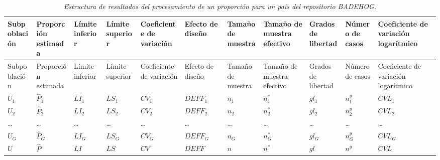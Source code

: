 \documentclass[
  12pt,
  spanish,
]{book}
\begin{document}
\begin{longtable}[]{@{}
  >{\centering\arraybackslash}p{}
  >{\centering\arraybackslash}p{}
  >{\centering\arraybackslash}p{}
  >{\centering\arraybackslash}p{}
  >{\centering\arraybackslash}p{}
  >{\centering\arraybackslash}p{}
  >{\centering\arraybackslash}p{}
  >{\centering\arraybackslash}p{}
  >{\centering\arraybackslash}p{}
  >{\centering\arraybackslash}p{}
  >{\centering\arraybackslash}p{}@{}}
\caption{\emph{Estructura de resultados del procesamiento de un proporción para un país del repositorio BADEHOG.}
\label{T2}}\tabularnewline
\toprule
Subpoblación & Proporción estimada & Límite inferior & Límite superior & Coeficiente de variación & Efecto de diseño & Tamaño de muestra & Tamaño de muestra efectivo & Grados de libertad & Número de casos & Coeficiente de variación logarítmico \\
\midrule
\endfirsthead
\toprule
Subpoblación & Proporción estimada & Límite inferior & Límite superior & Coeficiente de variación & Efecto de diseño & Tamaño de muestra & Tamaño de muestra efectivo & Grados de libertad & Número de casos & Coeficiente de variación logarítmico \\
\midrule
\endhead
\(U_1\) & \(\hat{P}_1\) & \(LI_1\) & \(LS_1\) & \(CV_1\) & \(DEFF_1\) & \(n_1\) & \(n^*_1\) & \(gl_1\) & \(n^y_1\) & \(CVL_1\) \\
\(U_2\) & \(\hat{P}_2\) & \(LI_2\) & \(LS_2\) & \(CV_2\) & \(DEFF_2\) & \(n_2\) & \(n^*_2\) & \(gl_2\) & \(n^y_2\) & \(CVL_2\) \\
\ldots{} & \ldots{} & \ldots{} & \ldots{} & \ldots{} & \ldots{} & \ldots{} & \ldots{} & \ldots{} & \ldots{} & \ldots{} \\
\(U_G\) & \(\hat{P}_G\) & \(LI_G\) & \(LS_G\) & \(CV_G\) & \(DEFF_G\) & \(n_G\) & \(n^*_G\) & \(gl_G\) & \(n^y_G\) & \(CVL_G\) \\
\(U\) & \(\hat{P}\) & \(LI\) & \(LS\) & \(CV\) & \(DEFF\) & \(n\) & \(n^*\) & \(gl\) & \(n^y\) & \(CVL\) \\
\bottomrule
\end{longtable}
\end{document}
